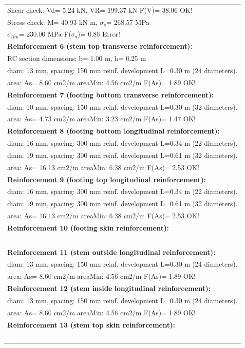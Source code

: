 \begin{center}
\begin{supertabular}[H]{|l|}
  Shear check: Vd=   5.24 kN,  VR= 199.37 kN  F(V)= 38.06 OK!\\
  Stress check: M=  40.93 kN m, $\sigma_s$= 268.57 MPa\\
    $\sigma_{lim}$= 230.00 MPa  F($\sigma_s$)= 0.86 Error!\\
\textbf{Reinforcement 6 (stem top transverse reinforcement):}\\
  RC section dimensions; b= 1.00 m, h= 0.25 m\\
  diam: 13 mm, spacing: 150 mm  reinf. development L=0.30 m (24 diameters).\\
  area: As=   8.60 cm2/m areaMin:   4.56 cm2/m  F(As)= 1.89 OK!\\
\textbf{Reinforcement 7 (footing bottom transverse reinforcement):}\\
  diam: 10 mm, spacing: 150 mm  reinf. development L=0.30 m (32 diameters).\\
  area: As=   4.73 cm2/m areaMin:   3.23 cm2/m  F(As)= 1.47 OK!\\
\textbf{Reinforcement 8 (footing bottom longitudinal reinforcement):}\\
  diam: 16 mm, spacing: 300 mm  reinf. development L=0.34 m (22 diameters).\\
  diam: 19 mm, spacing: 300 mm  reinf. development L=0.61 m (32 diameters).\\
  area: As=  16.13 cm2/m areaMin:   6.38 cm2/m  F(As)= 2.53 OK!\\
\textbf{Reinforcement 9 (footing top longitudinal reinforcement):}\\
  diam: 16 mm, spacing: 300 mm  reinf. development L=0.34 m (22 diameters).\\
  diam: 19 mm, spacing: 300 mm  reinf. development L=0.61 m (32 diameters).\\
  area: As=  16.13 cm2/m areaMin:   6.38 cm2/m  F(As)= 2.53 OK!\\
\textbf{Reinforcement 10 (footing skin reinforcement):}\\
  --\\
\textbf{Reinforcement 11 (stem outside longitudinal reinforcement):}\\
  diam: 13 mm, spacing: 150 mm  reinf. development L=0.30 m (24 diameters).\\
  area: As=   8.60 cm2/m areaMin:   4.56 cm2/m  F(As)= 1.89 OK!\\
\textbf{Reinforcement 12 (stem inside longitudinal reinforcement):}\\
  diam: 13 mm, spacing: 150 mm  reinf. development L=0.30 m (24 diameters).\\
  area: As=   8.60 cm2/m areaMin:   4.56 cm2/m  F(As)= 1.89 OK!\\
\textbf{Reinforcement 13 (stem top skin reinforcement):}\\
  --\\
\hline
\end{supertabular}
\end{center}
